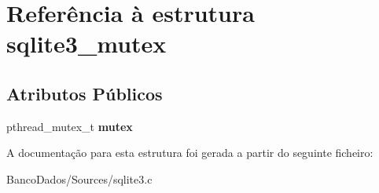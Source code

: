 \hypertarget{structsqlite3__mutex}{\section{Referência à estrutura sqlite3\-\_\-mutex}
\label{structsqlite3__mutex}
}
\subsection*{Atributos Públicos}
\begin{DoxyCompactItemize}
\item 
\hypertarget{structsqlite3__mutex_a6eef25bee73a3640dbbd052d707dbfdc}{pthread\-\_\-mutex\-\_\-t {\bfseries mutex}}\label{structsqlite3__mutex_a6eef25bee73a3640dbbd052d707dbfdc}

\end{DoxyCompactItemize}


A documentação para esta estrutura foi gerada a partir do seguinte ficheiro\-:\begin{DoxyCompactItemize}
\item 
Banco\-Dados/\-Sources/sqlite3.\-c\end{DoxyCompactItemize}
